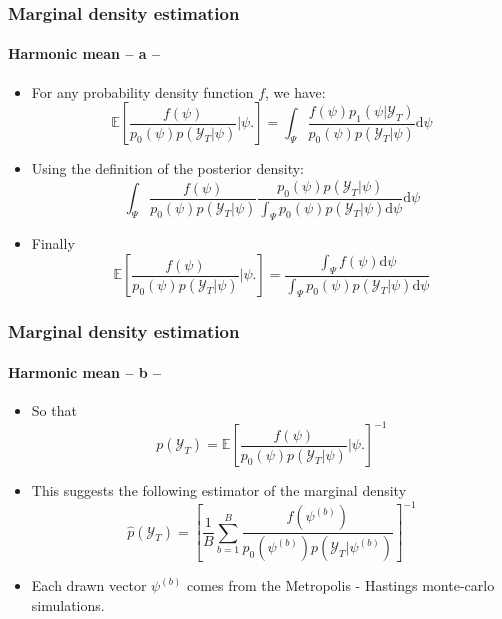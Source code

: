 \documentclass[10pt,slidestop]{beamer}
\newcommand{\sample}{\mathcal Y_T}
\begin{document}
\begin{frame}
  \frametitle{Marginal density estimation}
  \framesubtitle{Harmonic mean -- a --}

    \begin{itemize}
        \item For any probability density function $f$, we have:
        {\small
            \[
            \mathbb{E}\left[\frac{f(\psi)}{p_0(\psi)
                p(\sample|\psi)}\biggl|\psi\biggr.\right] =
            \int_{\Psi}
            \frac{f(\psi)p_1(\psi|\sample)}{p_0(\psi) p(\sample|\psi)}
            \mathrm d\psi
            \]
        }

\bigskip

\item Using the definition of the posterior density:
  {\footnotesize
            \[
                \int_{\Psi}
                \frac{f(\psi)}{p_0(\psi)
                p(\sample|\psi)}\frac{p_0(\psi)p(\sample|\psi)}
                {\int_{\Psi}p_0(\psi)p(\sample|\psi)\mathrm d\psi}\mathrm d\psi
            \]
        }

\bigskip

        \item Finally
        {\footnotesize
            \[
                \mathbb{E}\left[\frac{f(\psi)}{p_0(\psi)
                p(\sample|\psi)}\biggl|\psi\biggr.\right]
                =
                \frac{\int_{\Psi}f(\psi)\mathrm d\psi}{\int_{\Psi}p_0(\psi)
                p(\sample|\psi)\mathrm d\psi}
            \]
        }

    \end{itemize}

\end{frame}


\begin{frame}
  \frametitle{Marginal density estimation}
  \framesubtitle{Harmonic mean -- b --}


    \begin{itemize}
        \item So that
        \[
            p(\sample)=\mathbb{E}\left[\frac{f(\psi)}{p_0(\psi)p(\sample|\psi)}\biggl|\psi\biggr.\right]^{-1}
        \]

\bigskip

        \item This suggests the following estimator of the marginal
        density
        \[
            \widehat{p}(\sample)= \left[\frac{1}{B}\sum_{b=1}^B
            \frac{f(\psi^{(b)})}{p_0(\psi^{(b)})
            p(\sample|\psi^{(b)})}\right]^{-1}
        \]

\bigskip

        \item Each drawn vector $\psi^{(b)}$ comes from the
        Metropolis - Hastings monte-carlo simulations.

\end{itemize}

\end{frame}
\end{document}
